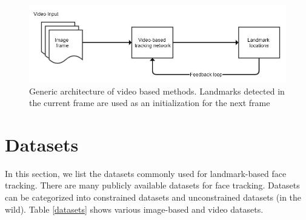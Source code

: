 \documentclass{llncs}
\begin{document}
\begin{figure}[h!]

\includegraphics[scale=0.5]{Media/generic_video_based}
\caption{Generic architecture of video based methods. Landmarks detected in the current frame are used as an initialization for the next frame}
\label{generic_video_based}
\end{figure}

\section{Datasets}

In this section, we list the datasets commonly used for landmark-based face tracking. There are many publicly available datasets for face tracking. Datasets can be categorized into constrained datasets and unconstrained datasets (in the wild).
Table \ref{datasets} shows various image-based and video datasets.
\end{document}
